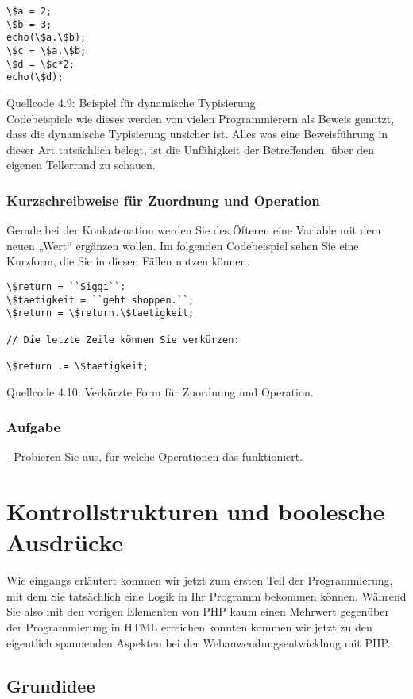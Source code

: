 \begin{verbatim}
\$a = 2;
\$b = 3;
echo(\$a.\$b);
\$c = \$a.\$b;
\$d = \$c*2;
echo(\$d);
\end{verbatim}
Quellcode 4.9: Beispiel für dynamische Typisierung\\

Codebeispiele wie dieses werden von vielen Programmierern als Beweis genutzt, dass die dynamische Typisierung unsicher ist. Alles was eine Beweisführung in dieser Art tatsächlich belegt, ist die Unfähigkeit der Betreffenden, über den eigenen Tellerrand zu schauen.

\subsubsection{Kurzschreibweise für Zuordnung und Operation}

Gerade bei der Konkatenation werden Sie des Öfteren eine Variable mit dem neuen „Wert“ ergänzen wollen. Im folgenden Codebeispiel sehen Sie eine Kurzform, die Sie in diesen Fällen nutzen können. 

\begin{verbatim}
\$return = ``Siggi``:
\$taetigkeit = ``geht shoppen.``;
\$return = \$return.\$taetigkeit;

// Die letzte Zeile können Sie verkürzen:

\$return .= \$taetigkeit;
\end{verbatim}
Quellcode 4.10: Verkürzte Form für Zuordnung und Operation.

\subsubsection{Aufgabe}

-	Probieren Sie aus, für welche Operationen das funktioniert.

\section{Kontrollstrukturen und boolesche Ausdrücke}

Wie eingangs erläutert kommen wir jetzt zum ersten Teil der Programmierung, mit dem Sie tatsächlich eine Logik in Ihr Programm bekommen können. Während Sie also mit den vorigen Elementen von PHP kaum einen Mehrwert gegenüber der Programmierung in HTML erreichen konnten kommen wir jetzt zu den eigentlich spannenden Aspekten bei der Webanwendungsentwicklung mit PHP.

\subsection{Grundidee}

